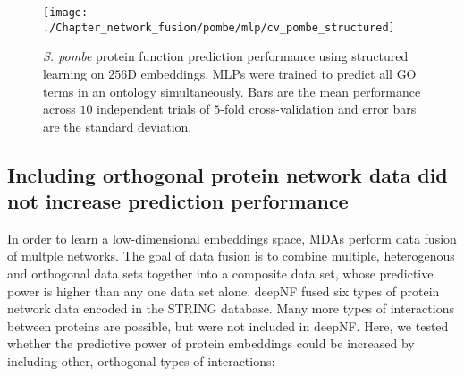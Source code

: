 
\begin{figure}[!hbt]
    \centering
    \texttt{[image: ./Chapter\_network\_fusion/pombe/mlp/cv\_pombe\_structured]}
    \caption{%
        \emph{S. pombe} protein function prediction performance using structured learning on $256$D embeddings.
        MLPs were trained to predict all GO terms in an ontology simultaneously.
        Bars are the mean performance across $10$ independent trials of $5$-fold cross-validation and error bars are the standard deviation.
    }
    \label{fig:pombe-all-cv}
\end{figure}


\subsection{Including orthogonal protein network data did not increase prediction performance}
\label{incorporating-additional-data-modes}

In order to learn a low-dimensional embeddings space, MDAs perform data fusion of multple networks. The goal of data fusion is to combine multiple, heterogenous and orthogonal data sets together into a composite data set, whose predictive power is higher than any one data set alone. deepNF fused six types of protein network data encoded in the STRING database. Many more types of interactions between proteins are possible, but were not included in deepNF. Here, we tested whether the predictive power of protein embeddings could be increased by including other, orthogonal types of interactions:

